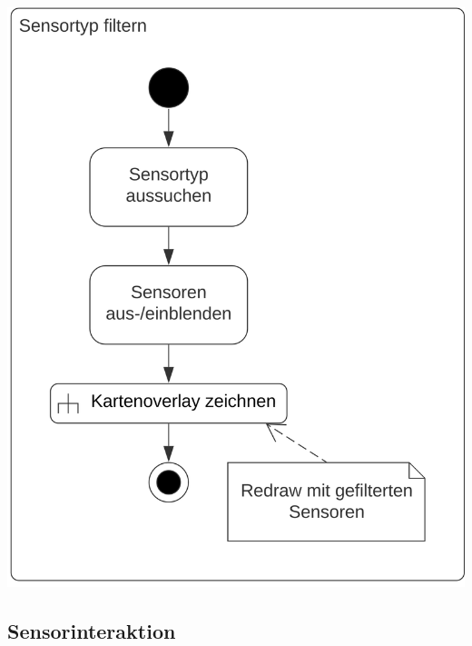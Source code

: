 \begin{center}
\includegraphics[scale=0.19]{media/activity-usage/SensortypFiltern}
\end{center}

\clearpage

\subsection{Sensorinteraktion}


